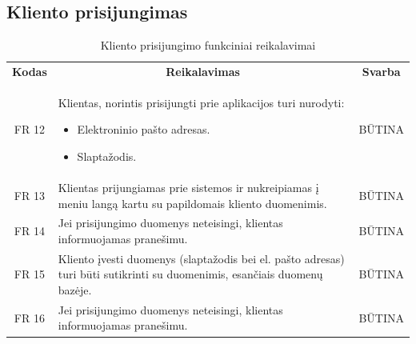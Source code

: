 \documentclass{VUMIFPSkursinis}
\begin{document}
\subsection{Kliento prisijungimas}

\begin{center}
	\begin{table}[H]
	\caption{Kliento prisijungimo funkciniai reikalavimai}
	\begin{tabular}{|p{2cm}|p{}|p{}|}
	\hline
	    \rowcolor{lightgray}
		\multicolumn{3}{|c|}{Kliento prisijungimas}\\
		
	\hline
		\multicolumn{1}{|c|}{{\bfseries Kodas}}&
		\multicolumn{1}{|c|}{{\bfseries Reikalavimas}}&
		\multicolumn{1}{|c|}{{\bfseries Svarba}}\\

	\hline
	
		\multicolumn{1}{|c|}{FR 12}&
		{Klientas, norintis prisijungti prie aplikacijos turi nurodyti:
			\begin{itemize}
				\item Elektroninio pašto adresas.
				\item Slaptažodis.
			\end{itemize}
		}&
		\multicolumn{1}{|c|}{BŪTINA}\\	
		
	\hline	
		\multicolumn{1}{|c|}{FR 13}&
		{Klientas prijungiamas prie sistemos ir nukreipiamas į meniu langą kartu su papildomais kliento duomenimis.}&
		\multicolumn{1}{|c|}{BŪTINA}\\
		
	\hline	
		\multicolumn{1}{|c|}{FR 14}&
		{Jei prisijungimo duomenys neteisingi, klientas informuojamas pranešimu.}&
		\multicolumn{1}{|c|}{BŪTINA}\\		
		
	\hline
		\multicolumn{1}{|c|}{FR 15}&
		{Kliento įvesti duomenys (slaptažodis bei el. pašto adresas) turi būti sutikrinti su duomenimis, esančiais duomenų bazėje.}&
		\multicolumn{1}{|c|}{BŪTINA}\\
		
	\hline	
		\multicolumn{1}{|c|}{FR 16}&
		{Jei prisijungimo duomenys neteisingi, klientas informuojamas pranešimu.}&
		\multicolumn{1}{|c|}{BŪTINA}\\
	\hline
	
	
	
	\end{tabular}	
	
	\label{table:VartotojoPrisijungimas}		
	\end{table}

\end{center}
\pagebreak
\end{document}
